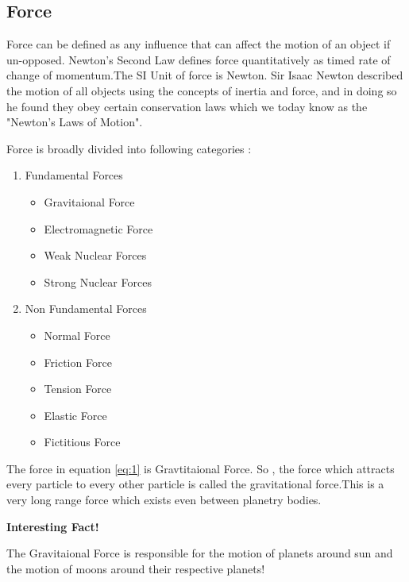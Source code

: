 \documentclass[a4paper, 12pt]{article}
\begin{document}
\subsection*{Force}
Force can be defined as any influence that can affect the motion of an object if un-opposed. Newton's Second Law defines force quantitatively as timed rate of change of momentum.The SI Unit of force is Newton. Sir Isaac Newton described the motion of all objects using the concepts of inertia and force, and in doing so he found they obey certain conservation laws which we today know as the "Newton's Laws of Motion". \par
Force is broadly divided into following categories : 
\begin{enumerate}
       \item Fundamental Forces
             \begin{itemize}
                    \item Gravitaional Force
                    \item Electromagnetic Force
                    \item Weak Nuclear Forces
                    \item Strong Nuclear Forces
             \end{itemize}
                    \item Non Fundamental Forces
                          \begin{itemize}
                                 \item Normal Force
                                 \item Friction Force
                                 \item Tension Force
                                 \item Elastic Force
                                 \item Fictitious Force
                          \end{itemize}
\end{enumerate}
The force in equation \ref{eq:1} is Gravtitaional Force. So , the force  which  attracts every particle to every other particle is called the gravitational force.This is a very long range force which exists even between planetry bodies. \par
\textbf{\bfseries \large Interesting Fact!} \par
The Gravitaional Force is responsible for the motion of planets around sun and the motion of moons around their respective planets! 
\end{document}
